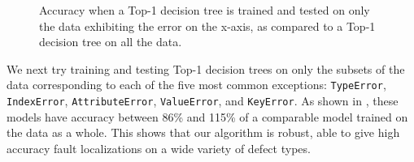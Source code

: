 \documentclass[conference]{IEEEtran}
\newcommand\lt[1]{{\lstinline|#1|}}
\begin{document}
\begin{figure}
\caption{Accuracy when a Top-1 decision tree is trained and tested on only the data exhibiting
the error on the x-axis, as compared to a Top-1 decision tree on all the data.
}
\label{fig-defect-categories}
\end{figure}

We next try training and testing Top-1 decision trees on only the subsets of
the data
corresponding to each of the five most common exceptions: \lt{TypeError},
\lt{IndexError}, \lt{AttributeError}, \lt{ValueError}, and \lt{KeyError}.
As shown in , these models have accuracy between
86\% and 115\% of a comparable model trained on the data as a whole. This shows
that our algorithm is robust, able to give high accuracy fault localizations on
a wide variety of defect types.






\end{document}
